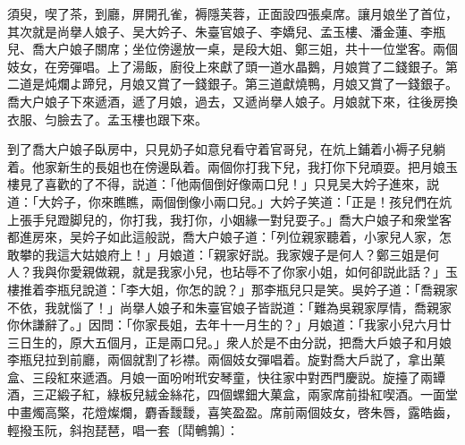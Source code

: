 須臾，喫了茶，到廳，屏開孔雀，褥隱芙蓉，正面設四張桌席。讓月娘坐了首位，其次就是尚擧人娘子、吴大妗子、朱臺官娘子、李嬌兒、孟玉樓、潘金蓮、李瓶兒、喬大户娘子關席；坐位傍邊放一桌，是段大姐、鄭三姐，共十一位堂客。兩個妓女，在旁彈唱。上了湯飯，廚役上來獻了頭一道水晶鵝，月娘賞了二錢銀子。第二道是炖爛よ蹄兒，月娘又賞了一錢銀子。第三道獻燒鴨，月娘又賞了一錢銀子。喬大户娘子下來遞酒，遞了月娘，過去，又遞尚擧人娘子。月娘就下來，往後房換衣服、匀臉去了。孟玉樓也跟下來。

到了喬大户娘子臥房中，只見奶子如意兒看守着官哥兒，在炕上鋪着小褥子兒躺着。他家新生的長姐也在傍邊臥着。兩個你打我下兒，我打你下兒頑耍。把月娘玉樓見了喜歡的了不得，説道：「他兩個倒好像兩口兒！」只見吴大妗子進來，説道：「大妗子，你來瞧瞧，兩個倒像小兩口兒。」大妗子笑道：「正是！孩兒們在炕上張手兒蹬脚兒的，你打我，我打你，小姻緣一對兒耍子。」喬大户娘子和衆堂客都進房來，吴妗子如此這般説，喬大户娘子道：「列位親家聽着，小家兒人家，怎敢攀的我這大姑娘府上！」月娘道：「親家好説。我家嫂子是何人？鄭三姐是何人？我與你愛親做親，就是我家小兒，也玷辱不了你家小姐，如何卻説此話？」玉樓推着李瓶兒說道：「李大姐，你怎的說？」那李瓶兒只是笑。吳妗子道：「喬親家不依，我就惱了！」尚擧人娘子和朱臺官娘子皆説道：「難為吳親家厚情，喬親家你休謙辭了。」因問：「你家長姐，去年十一月生的？」月娘道：「我家小兒六月廿三日生的，原大五個月，正是兩口兒。」衆人於是不由分説，把喬大戶娘子和月娘李瓶兒拉到前廳，兩個就割了衫襟。兩個妓女彈唱着。旋對喬大戶説了，拿出菓盒、三段紅來遞酒。月娘一面吩咐玳安琴童，快往家中對西門慶説。旋擡了兩罈酒，三疋緞子紅，綠板兒絨金絲花，四個螺鈿大菓盒，兩家席前掛紅喫酒。一面堂中畫燭高檠，花燈燦爛，麝香靉靉，喜笑盈盈。席前兩個妓女，啓朱唇，露皓齒，輕撥玉阮，斜抱琵琶，唱一套〔鬦鵪鶉〕：

